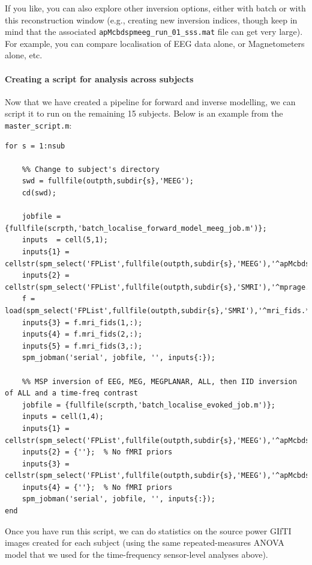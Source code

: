 If you like, you can also explore other inversion options, either with batch or with this reconstruction window (e.g., creating new inversion indices, though keep in mind that the associated \texttt{apMcbdspmeeg\_run\_01\_sss.mat} file can get very large). For example, you can compare localisation of EEG data alone, or Magnetometers alone, etc.

\paragraph{Creating a script for analysis across subjects}

Now that we have created a pipeline for forward and inverse modelling, we can script it to run on the remaining 15 subjects. Below is an example from the \texttt{master\_script.m}:

\begin{lstlisting}[style=Matlab-editor,basicstyle=\mlttfamily\footnotesize]
for s = 1:nsub
    
    %% Change to subject's directory
    swd = fullfile(outpth,subdir{s},'MEEG');
    cd(swd);

    jobfile = {fullfile(scrpth,'batch_localise_forward_model_meeg_job.m')};
    inputs  = cell(5,1);
    inputs{1} = cellstr(spm_select('FPList',fullfile(outpth,subdir{s},'MEEG'),'^apMcbdspmeeg.*\.mat$'));
    inputs{2} = cellstr(spm_select('FPList',fullfile(outpth,subdir{s},'SMRI'),'^mprage.*\.nii$'));
    f = load(spm_select('FPList',fullfile(outpth,subdir{s},'SMRI'),'^mri_fids.*\.mat$'));
    inputs{3} = f.mri_fids(1,:);
    inputs{4} = f.mri_fids(2,:);
    inputs{5} = f.mri_fids(3,:);
    spm_jobman('serial', jobfile, '', inputs{:});

    %% MSP inversion of EEG, MEG, MEGPLANAR, ALL, then IID inversion of ALL and a time-freq contrast
    jobfile = {fullfile(scrpth,'batch_localise_evoked_job.m')};
    inputs = cell(1,4);
    inputs{1} = cellstr(spm_select('FPList',fullfile(outpth,subdir{s},'MEEG'),'^apMcbdspmeeg.*\.mat$'));
    inputs{2} = {''};  % No fMRI priors
    inputs{3} = cellstr(spm_select('FPList',fullfile(outpth,subdir{s},'MEEG'),'^apMcbdspmeeg.*\.mat'));
    inputs{4} = {''};  % No fMRI priors
    spm_jobman('serial', jobfile, '', inputs{:});
end
\end{lstlisting}

Once you have run this script, we can do statistics on the source power GIfTI images created for each subject (using the same repeated-measures ANOVA model that we used for the time-frequency sensor-level analyses above).

